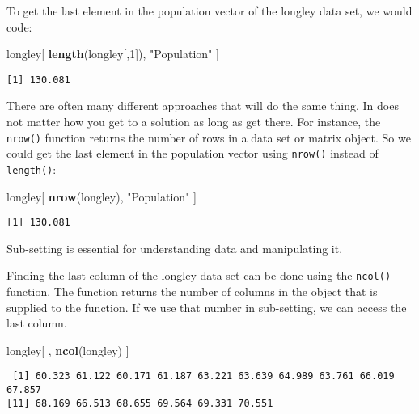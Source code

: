 \documentclass[]{article}
\newenvironment{Shaded}{\begin{snugshade}}{\end{snugshade}}
\newcommand{\DecValTok}[1]{\textcolor[rgb]{0.00,0.00,0.81}{#1}}
\newcommand{\KeywordTok}[1]{\textcolor[rgb]{0.13,0.29,0.53}{\textbf{#1}}}
\newcommand{\NormalTok}[1]{#1}
\newcommand{\StringTok}[1]{\textcolor[rgb]{0.31,0.60,0.02}{#1}}
\begin{document}
To get the last element in the population vector of the longley data set, we would code:

\begin{Shaded}
\begin{Highlighting}[]
\NormalTok{longley[ }\KeywordTok{length}\NormalTok{(longley[,}\DecValTok{1}\NormalTok{]), }\StringTok{"Population"}\NormalTok{ ]}
\end{Highlighting}
\end{Shaded}

\begin{verbatim}
[1] 130.081
\end{verbatim}

There are often many different approaches that will do the same thing. In does not matter how you get to a solution as long as get there. For instance, the \texttt{nrow()} function returns the number of rows in a data set or matrix object. So we could get the last element in the population vector using \texttt{nrow()} instead of \texttt{length()}:

\begin{Shaded}
\begin{Highlighting}[]
\NormalTok{longley[ }\KeywordTok{nrow}\NormalTok{(longley), }\StringTok{"Population"}\NormalTok{ ]}
\end{Highlighting}
\end{Shaded}

\begin{verbatim}
[1] 130.081
\end{verbatim}

Sub-setting is essential for understanding data and manipulating it.

Finding the last column of the longley data set can be done using the \texttt{ncol()} function. The function returns the number of columns in the object that is supplied to the function. If we use that number in sub-setting, we can access the last column.

\begin{Shaded}
\begin{Highlighting}[]
\NormalTok{longley[ , }\KeywordTok{ncol}\NormalTok{(longley) ]}
\end{Highlighting}
\end{Shaded}

\begin{verbatim}
 [1] 60.323 61.122 60.171 61.187 63.221 63.639 64.989 63.761 66.019 67.857
[11] 68.169 66.513 68.655 69.564 69.331 70.551
\end{verbatim}
\end{document}
